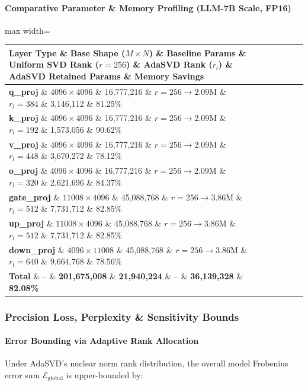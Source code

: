 \paragraph{Comparative Parameter \& Memory Profiling (LLM-7B Scale, FP16)}

\begin{center}
\begin{adjustbox}{max width=\columnwidth}
\renewcommand{\arraystretch}{1.2}
\begin{tabular}{lllllll}
\toprule
Layer Type \& Base Shape ($M \times N$) \& Baseline Params \& Uniform SVD Rank ($r=256$) \& AdaSVD Rank ($r_l$) \& AdaSVD Retained Params \& Memory Savings \\
\midrule
\textbf{q\_proj} \& $4096 \times 4096$ \& 16,777,216 \& $r=256 \to 2.09\text{M}$ \& $r_l=384$ \& 3,146,112 \& 81.25\% \\
\textbf{k\_proj} \& $4096 \times 4096$ \& 16,777,216 \& $r=256 \to 2.09\text{M}$ \& $r_l=192$ \& 1,573,056 \& 90.62\% \\
\textbf{v\_proj} \& $4096 \times 4096$ \& 16,777,216 \& $r=256 \to 2.09\text{M}$ \& $r_l=448$ \& 3,670,272 \& 78.12\% \\
\textbf{o\_proj} \& $4096 \times 4096$ \& 16,777,216 \& $r=256 \to 2.09\text{M}$ \& $r_l=320$ \& 2,621,696 \& 84.37\% \\
\textbf{gate\_proj} \& $11008 \times 4096$ \& 45,088,768 \& $r=256 \to 3.86\text{M}$ \& $r_l=512$ \& 7,731,712 \& 82.85\% \\
\textbf{up\_proj} \& $11008 \times 4096$ \& 45,088,768 \& $r=256 \to 3.86\text{M}$ \& $r_l=512$ \& 7,731,712 \& 82.85\% \\
\textbf{down\_proj} \& $4096 \times 11008$ \& 45,088,768 \& $r=256 \to 3.86\text{M}$ \& $r_l=640$ \& 9,664,768 \& 78.56\% \\
\textbf{Total} \& -- \& \textbf{201,675,008} \& \textbf{21,940,224} \& -- \& \textbf{36,139,328} \& \textbf{82.08\%} \\

\bottomrule
\end{tabular}
\end{adjustbox}
\end{center}

\subsubsection*{Precision Loss, Perplexity \& Sensitivity Bounds}

\paragraph{Error Bounding via Adaptive Rank Allocation}
Under AdaSVD's nuclear norm rank distribution, the overall model Frobenius error sum $\mathcal{E}_{\text{global}}$ is upper-bounded by:

